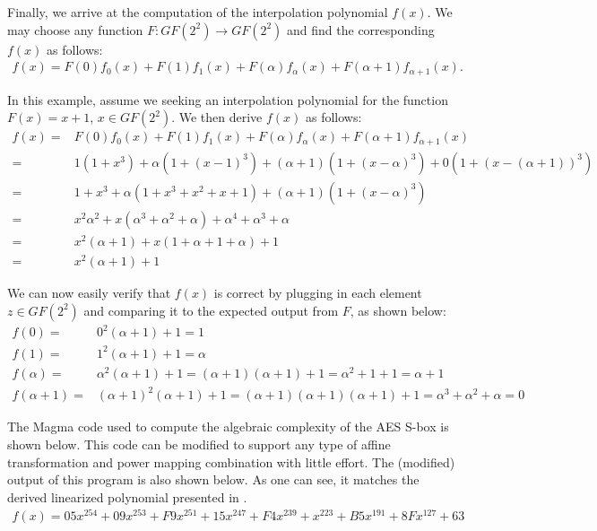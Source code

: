 Finally, we arrive at the computation of the interpolation polynomial $f(x)$. We may choose any function
$F : GF(2^2) \to GF(2^2)$ and find the corresponding $f(x)$ as follows:
\begin{align*}
f(x) = F(0)f_0(x) + F(1)f_1(x) + F(\alpha)f_{\alpha}(x) + F(\alpha+1)f_{\alpha+1}(x).
\end{align*}

In this example, assume we seeking an interpolation polynomial for the function $F(x) = x + 1$, $x \in GF(2^2)$. 
We then derive $f(x)$ as follows:
\begin{align*}
f(x) = & F(0)f_0(x) + F(1)f_1(x) + F(\alpha)f_{\alpha}(x) + F(\alpha+1)f_{\alpha+1}(x) \\
= & 1(1+x^3) + \alpha(1 + (x - 1)^3) + (\alpha + 1)(1 + (x - \alpha)^3) + 0(1 + (x - (\alpha + 1))^3) \\
= & 1 + x^3 + \alpha(1 + x^3 + x^2 + x + 1) + (\alpha + 1)(1 + (x - \alpha)^3) \\
= & x^2\alpha^2 + x(\alpha^3 + \alpha^2 + \alpha) + \alpha^4 + \alpha^3 + \alpha \\
= & x^2(\alpha + 1) + x(1 + \alpha + 1 + \alpha) + 1 \\
= & x^2(\alpha + 1) + 1
\end{align*}

We can now easily verify that $f(x)$ is correct by plugging in each element $z \in GF(2^2)$ and comparing
it to the expected output from $F$, as shown below:
\begin{align*}
f(0) = & 0^2(\alpha + 1) + 1 = 1 \\
f(1) = & 1^2(\alpha + 1) + 1 = \alpha \\
f(\alpha) = & \alpha^2(\alpha + 1) + 1 = (\alpha + 1)(\alpha + 1) + 1 = \alpha^2 + 1 + 1 = \alpha + 1 \\
f(\alpha + 1) = & (\alpha + 1)^2(\alpha + 1) + 1 = (\alpha + 1)(\alpha + 1)(\alpha + 1) + 1 = \alpha^3 + \alpha^2 + \alpha = 0
\end{align*}

The Magma code used to compute the algebraic complexity of the AES S-box is shown below. This code can be modified to support any type of affine transformation and power mapping combination with little effort. The (modified) output of this program is also shown below. As one can see, it matches the derived linearized polynomial presented in \cite{Daemen02-1}.
\begin{align*}
f(x) = 05x^{254} + 09x^{253} + F9x^{251} + 15x^{247} + F4x^{239} + x^{223} + B5x^{191} + 8Fx^{127} + 63
\end{align*}

